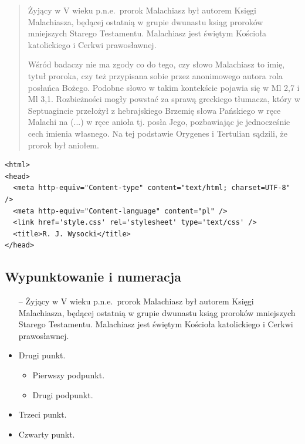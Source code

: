\documentclass[12pt,a4paper]{article}
\begin{document}
\begin{quotation}
Żyjący w V wieku p.n.e.~prorok Malachiasz był autorem Księgi Malachiasza, będącej
ostatnią w grupie dwunastu ksiąg proroków mniejszych Starego Testamentu. Malachiasz jest
świętym Kościoła katolickiego i Cerkwi prawosławnej.

Wśród badaczy nie ma zgody co do
tego, czy słowo Malachiasz to imię, tytuł proroka, czy też przypisana sobie przez
anonimowego autora rola posłańca Bożego. Podobne słowo w takim kontekście pojawia
się w Ml 2,7 i Ml 3,1. Rozbieżności mogły powstać za sprawą greckiego tłumacza, który
w Septuagincie przełożył z hebrajskiego Brzemię słowa Pańskiego w ręce Malachi na
(...) w ręce anioła tj. posła Jego, pozbawiając je jednocześnie cech
imienia własnego. Na tej podstawie Orygenes i Tertulian sądzili, że prorok był aniołem.
\end{quotation}

{\footnotesize
\begin{verbatim}
<html>
<head>
  <meta http-equiv="Content-type" content="text/html; charset=UTF-8" />
  <meta http-equiv="Content-language" content="pl" />
  <link href='style.css' rel='stylesheet' type='text/css' />
  <title>R. J. Wysocki</title>
</head>
\end{verbatim}
}

\subsection{Wypunktowanie i numeracja}

\begin{itemize}
\item[--] Żyjący w V wieku p.n.e.~prorok Malachiasz był autorem Księgi Malachiasza, będącej
  ostatnią w grupie dwunastu ksiąg proroków mniejszych Starego Testamentu. Malachiasz jest
  świętym Kościoła katolickiego i Cerkwi prawosławnej.
\item Drugi punkt.
  \begin{itemize}
  \item Pierwszy podpunkt.
  \item Drugi podpunkt.
  \end{itemize}
\item Trzeci punkt.
\item Czwarty punkt.
\end{itemize}
\end{document}
